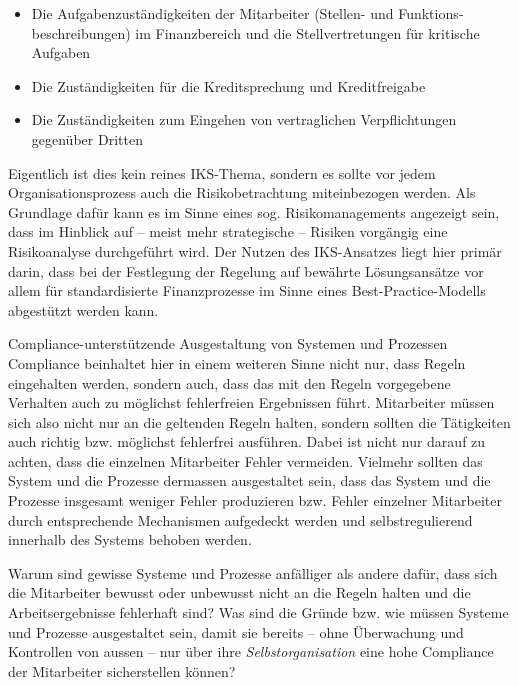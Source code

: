 \documentclass[10pt]{article}
\begin{document}
\begin{itemize}
    \item Die Aufgabenzuständigkeiten der Mitarbeiter (Stellen- und Funktions­beschreibungen) im Finanzbereich und die Stellvertretungen für kritische Aufgaben

    \item Die Zuständigkeiten für die Kreditsprechung und Kreditfreigabe

    \item Die Zuständigkeiten zum Eingehen von vertraglichen Verpflichtungen gegenüber Dritten

\end{itemize}

Eigentlich ist dies kein reines IKS-Thema, sondern es sollte vor jedem Organisations­prozess auch die Risikobetrachtung miteinbezogen werden. Als Grundlage dafür kann es im Sinne eines sog. Risikomanagements angezeigt sein, dass im Hinblick auf -- meist mehr strategische -- Risiken vorgängig eine Risikoanalyse durchgeführt wird. Der Nutzen des IKS-Ansatzes liegt hier primär darin, dass bei der Festlegung der Regelung auf bewährte Lösungsansätze vor allem für standardisierte Finanzprozesse im Sinne eines Best-Practice-Modells abgestützt werden kann.

 Compliance-unterstützende Ausgestaltung von Systemen und Prozessen\\
Compliance beinhaltet hier in einem weiteren Sinne nicht nur, dass Regeln eingehalten werden, sondern auch, dass das mit den Regeln vorgegebene Verhalten auch zu möglichst fehlerfreien Ergebnissen führt. Mitarbeiter müssen sich also nicht nur an die geltenden Regeln halten, sondern sollten die Tätigkeiten auch richtig bzw. möglichst fehlerfrei ausführen. Dabei ist nicht nur darauf zu achten, dass die einzelnen Mitarbeiter Fehler vermeiden. Vielmehr sollten das System und die Prozesse dermassen ausgestaltet sein, dass das System und die Prozesse insgesamt weniger Fehler produzieren bzw. Fehler einzelner Mitarbeiter durch entsprechende Mechanismen aufgedeckt werden und selbstregulierend innerhalb des Systems behoben werden.

Warum sind gewisse Systeme und Prozesse anfälliger als andere dafür, dass sich die Mitarbeiter bewusst oder unbewusst nicht an die Regeln halten und die Arbeitsergebnisse fehlerhaft sind? Was sind die Gründe bzw. wie müssen Systeme und Prozesse ausgestaltet sein, damit sie bereits -- ohne Überwachung und Kontrollen von aussen -- nur über ihre \textit{Selbstorganisation} eine hohe Compliance der Mitarbeiter sicherstellen können?
\end{document}
